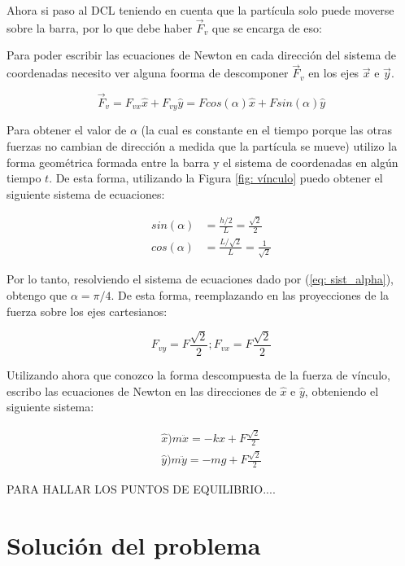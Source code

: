 \documentclass{article}
\begin{document}
Ahora si paso al DCL teniendo en cuenta que la partícula solo puede moverse sobre la barra, por lo que debe haber $\vec{F}_{v}$ que se encarga de eso:

\begin{figure}
    \label{fig: DCL}
\end{figure}

Para poder escribir las ecuaciones de Newton en cada dirección del sistema de coordenadas necesito ver alguna foorma de descomponer $\vec{F}_v$ en los ejes $\vec{x}$ e $\vec{y}$.

\begin{equation}
    \vec{F}_v = F_{vx} \hat{x} + F_{vy} \hat{y} = Fcos(\alpha) \hat{x} + Fsin(\alpha) \hat{y}
\end{equation}

Para obtener el valor de $\alpha$ (la cual es constante en el tiempo porque las otras fuerzas no cambian de dirección a medida que la partícula se mueve) utilizo la forma geométrica formada entre la barra y el sistema de coordenadas en algún tiempo $t$. De esta forma, utilizando la Figura \ref{fig: vínculo} puedo obtener el siguiente sistema de ecuaciones:

\begin{equation}
\begin{split}
    sin(\alpha) &= \frac{h/2}{L} = \frac{\sqrt{2}}{2} \\
    cos(\alpha) &= \frac{L/\sqrt{2}}{L} = \frac{1}{\sqrt{2}}
    \label{eq: sist_alpha}
\end{split}
\end{equation}

Por lo tanto, resolviendo el sistema de ecuaciones dado por (\ref{eq: sist_alpha}), obtengo que $\alpha = \pi/4$. De esta forma, reemplazando en las proyecciones de la fuerza sobre los ejes cartesianos:

\begin{equation}
    F_{vy} = F \frac{\sqrt{2}}{2}; F_{vx} = F \frac{\sqrt{2}}{2}
\end{equation}

Utilizando ahora que conozco la forma descompuesta de la fuerza de vínculo, escribo las ecuaciones de Newton en las direcciones de $\hat{x}$ e $\hat{y}$, obteniendo el siguiente sistema:

\begin{equation}
\begin{split}
    \hat{x}\big) m\ddot{x} = -kx + F\frac{\sqrt{2}}{2} \\
    \hat{y}\big) m\ddot{y} = -mg + F\frac{\sqrt{2}}{2}
\end{split}
\end{equation}

PARA HALLAR LOS PUNTOS DE EQUILIBRIO....

\section{Solución del problema}
\end{document}
